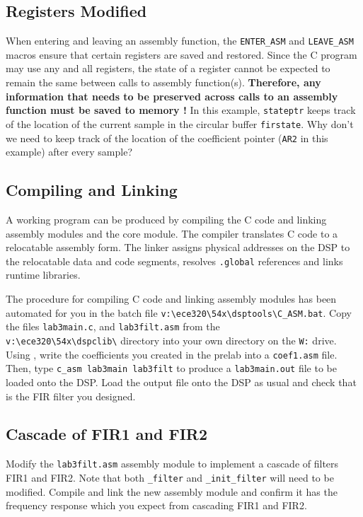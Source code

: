 \subsection{Registers Modified}

When entering and leaving an assembly function, the \verb+ENTER_ASM+ 
and \verb+LEAVE_ASM+ macros ensure that certain registers are saved 
and restored.  Since the C program may use any and all registers, the 
state of a register cannot be expected to remain the same between
calls to assembly function(s).  {\bf Therefore, any information that 
needs to be preserved across calls to an assembly function must be 
saved to memory !}  In this example, \verb+stateptr+ keeps track of the 
location of the current sample in the circular buffer \verb+firstate+.  
Why don't we need to keep track of the location of the coefficient pointer 
(\verb+AR2+ in this example) after every sample?

\subsection{Compiling and Linking}

A working program can be produced by compiling the C code and linking 
assembly modules and the core module.  The compiler translates C code 
to a relocatable assembly form.  The linker assigns physical addresses on 
the DSP to the relocatable data and code segments, resolves \verb+.global+ 
references and links runtime libraries.

The procedure for compiling C code and linking assembly modules has been 
automated for you in the batch file 
\verb+v:\ece320\54x\dsptools\C_ASM.bat+.  
Copy the files \verb+lab3main.c+, and 
\verb+lab3filt.asm+ from the \\
\verb+v:\ece320\54x\dspclib\+ directory 
into your own directory on the \verb+W:+ drive.  Using \matlab, 
write the coefficients you created in the prelab into 
a \verb+coef1.asm+ file.  Then, type 
\verb+c_asm lab3main lab3filt+ to produce a \verb+lab3main.out+ file 
to be loaded onto the DSP.  Load the output file onto the DSP as usual and 
check that is the FIR filter you designed.

\subsection{Cascade of FIR1 and FIR2}

Modify the \verb+lab3filt.asm+ assembly module to implement a 
cascade of filters FIR1 and FIR2.  Note that both \verb+_filter+ 
and \verb+_init_filter+ will need to be modified.  
Compile and link the new assembly module and confirm it has the 
frequency response which you expect from cascading FIR1 and FIR2.

